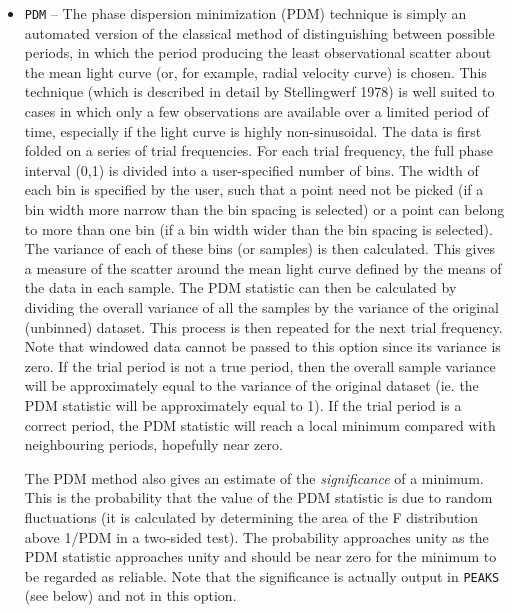 \begin{itemize}
\item {\tt PDM} -- The phase dispersion minimization (PDM) technique is 
simply an automated version of the classical method of distinguishing
between possible periods, in which the period producing the least
observational scatter about the mean light curve (or, for example,
radial velocity curve) is chosen. This technique (which is described in
detail by Stellingwerf 1978) is well suited to cases in 
which only a few observations are available over a limited period of time,
especially if the light curve is highly non-sinusoidal.
The data is first folded on a series of trial frequencies. For each trial 
frequency, the full phase interval (0,1) is divided into a user-specified 
number of bins. The width of each bin is specified by the user, such that 
a point need not be picked (if a bin width more narrow than the bin spacing
is selected) or a point can belong to more than one bin (if a bin width
wider than the bin spacing is selected). The variance of each of these
bins (or samples) is then calculated. This gives a measure of the scatter
around the mean light curve defined by the means of the data in each sample.
The PDM statistic can then be calculated by dividing the overall variance
of all the samples by the variance of the original (unbinned) dataset. This 
process is then repeated for the next trial frequency. Note that windowed data 
cannot be passed to this option since its variance is zero. If the trial 
period is 
not a true period, then the overall sample variance will be approximately equal 
to the variance of the original dataset (ie. the PDM statistic will be
approximately equal to 1). If the trial period is a correct period, the PDM
statistic will reach a local minimum compared with neighbouring periods, 
hopefully near zero. 

The PDM method also gives an estimate of the {\em significance} 
of a minimum. This
is the probability that the value of the PDM statistic is due to random
fluctuations (it is calculated by determining the area of the F distribution
above 1/PDM in a two-sided test). The probability approaches unity as the
PDM statistic approaches unity and should be near zero for the minimum to be
regarded as reliable. Note that the significance is actually output in 
{\tt PEAKS} (see below) and not in this option. 


\end{itemize}
